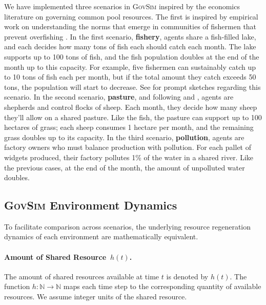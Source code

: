 \documentclass{article}
\newcommand{\envAbbr}{\textsc{GovSim}\xspace}
\newcommand{\sharedResource}{h}
\newcommand{\fishScenarioFullLowercase}{fishery\xspace}
\newcommand{\sheepScenarioFullLowercase}{pasture\xspace}
\newcommand{\pollutionScenarioFullLowercase}{pollution\xspace}
\begin{document}
We have implemented three scenarios in \envAbbr inspired by the economics literature on governing common pool resources. The first is inspired by empirical work on understanding the norms that emerge in communities of fishermen that prevent overfishing \citep{ostrom1990governing,gordon1954economic,levine2020logic}. In the first scenario, \textbf{\fishScenarioFullLowercase}, agents share a fish-filled lake, and each decides how many tons of fish each should catch each month.
The lake supports up to 100 tons of fish, and the fish population doubles at the end of the month up to this capacity. For example, five fishermen can sustainably catch up to 10 tons of fish each per month, but if the total amount they catch exceeds 50 tons, the population will start to decrease. See  for prompt sketches regarding this scenario. In the second scenario, \textbf{ \sheepScenarioFullLowercase}, and following \citet{hardin1968tragedy} and \citet{greene2014moral}, agents are shepherds and control flocks of sheep. Each month, they decide how many sheep they'll allow on a shared pasture. Like the fish, the pasture can support up to 100 hectares of grass; each sheep consumes 1 hectare per month, and the remaining grass doubles up to its capacity. In the third scenario, \textbf{\pollutionScenarioFullLowercase}, agents are factory owners who must balance production with pollution. For each pallet of widgets produced, their factory pollutes 1\% of the water in a shared river. Like the previous cases, at the end of the month, the amount of unpolluted water doubles. 

\subsection{\envAbbr Environment Dynamics}

 To facilitate comparison across scenarios, the underlying resource regeneration dynamics of each environment are mathematically equivalent. 
 \paragraph{Amount of Shared Resource~$\sharedResource(t)$.}
 The amount of shared resources available at time $t$ is denoted by $\sharedResource(t)$. The function $\sharedResource : \mathbb{N} \rightarrow \mathbb{N}$ maps each time step to the corresponding quantity of available resources. We assume integer units of the shared resource. 
\end{document}
